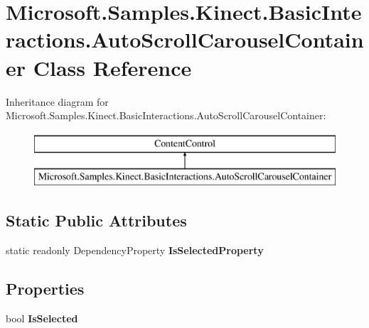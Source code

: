 \hypertarget{class_microsoft_1_1_samples_1_1_kinect_1_1_basic_interactions_1_1_auto_scroll_carousel_container}{\section{Microsoft.\-Samples.\-Kinect.\-Basic\-Interactions.\-Auto\-Scroll\-Carousel\-Container Class Reference}
\label{class_microsoft_1_1_samples_1_1_kinect_1_1_basic_interactions_1_1_auto_scroll_carousel_container}
}
Inheritance diagram for Microsoft.\-Samples.\-Kinect.\-Basic\-Interactions.\-Auto\-Scroll\-Carousel\-Container\-:\begin{figure}[H]
\begin{center}
\leavevmode
\includegraphics[height=2.000000cm]{class_microsoft_1_1_samples_1_1_kinect_1_1_basic_interactions_1_1_auto_scroll_carousel_container}
\end{center}
\end{figure}
\subsection*{Static Public Attributes}
\begin{DoxyCompactItemize}
\item 
static readonly Dependency\-Property {\bfseries Is\-Selected\-Property}
\end{DoxyCompactItemize}
\subsection*{Properties}
\begin{DoxyCompactItemize}
\item 
\hypertarget{class_microsoft_1_1_samples_1_1_kinect_1_1_basic_interactions_1_1_auto_scroll_carousel_container_a39e6a7b3f334d9b93cd09d6b03c0f909}{bool {\bfseries Is\-Selected}}\label{class_microsoft_1_1_samples_1_1_kinect_1_1_basic_interactions_1_1_auto_scroll_carousel_container_a39e6a7b3f334d9b93cd09d6b03c0f909}

\end{DoxyCompactItemize}


